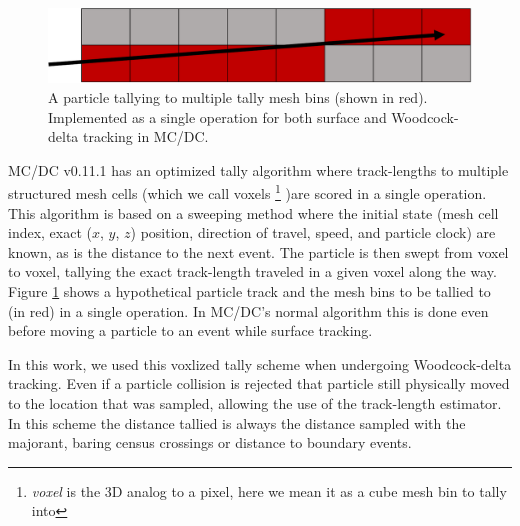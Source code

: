 \begin{figure}[!htb]
  \centering
  \includegraphics[width=\textwidth]{figures/delta_figs/tally_ray.pdf}
  \caption{A particle tallying to multiple tally mesh bins (shown in red). Implemented as a single operation for both surface and Woodcock-delta tracking in MC/DC.}
  \label{fig:tally_ray}
\end{figure}

MC/DC v0.11.1 \cite{morgan_monte_2024} has an optimized tally algorithm where track-lengths to multiple structured mesh cells (which we call voxels
\footnote{\textit{voxel} is the 3D analog to a pixel, here we mean it as a cube mesh bin to tally into}
)are scored in a single operation.
This algorithm is based on a sweeping method where the initial state (mesh cell index, exact ($x$, $y$, $z$) position, direction of travel, speed, and particle clock) are known, as is the distance to the next event.
The particle is then swept from voxel to voxel, tallying the exact track-length traveled in a given voxel along the way.
Figure \ref{fig:tally_ray} shows a hypothetical particle track and the mesh bins to be tallied to (in red) in a single operation.
In MC/DC's normal algorithm this is done even before moving a particle to an event while surface tracking.

In this work, we used this voxlized tally scheme when undergoing Woodcock-delta tracking.
Even if a particle collision is rejected that particle still physically moved to the location that was sampled, allowing the use of the track-length estimator.
In this scheme the distance tallied is always the distance sampled with the majorant, baring census crossings or distance to boundary events.

